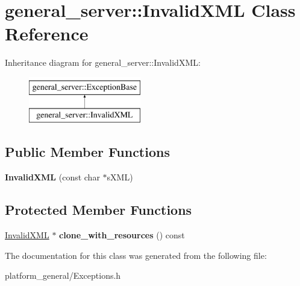 \hypertarget{classgeneral__server_1_1InvalidXML}{\section{general\-\_\-server\-:\-:\-Invalid\-X\-M\-L \-Class \-Reference}
\label{classgeneral__server_1_1InvalidXML}
}
\-Inheritance diagram for general\-\_\-server\-:\-:\-Invalid\-X\-M\-L\-:\begin{figure}[H]
\begin{center}
\leavevmode
\includegraphics[height=2.000000cm]{classgeneral__server_1_1InvalidXML}
\end{center}
\end{figure}
\subsection*{\-Public \-Member \-Functions}
\begin{DoxyCompactItemize}
\item 
\hypertarget{classgeneral__server_1_1InvalidXML_a9f258d33092e09e539108c6c1625bd77}{{\bfseries \-Invalid\-X\-M\-L} (const char $\ast$s\-X\-M\-L)}\label{classgeneral__server_1_1InvalidXML_a9f258d33092e09e539108c6c1625bd77}

\end{DoxyCompactItemize}
\subsection*{\-Protected \-Member \-Functions}
\begin{DoxyCompactItemize}
\item 
\hypertarget{classgeneral__server_1_1InvalidXML_a541bda876d02e02bf325dffab06bc63f}{\hyperlink{classgeneral__server_1_1InvalidXML}{\-Invalid\-X\-M\-L} $\ast$ {\bfseries clone\-\_\-with\-\_\-resources} () const }\label{classgeneral__server_1_1InvalidXML_a541bda876d02e02bf325dffab06bc63f}

\end{DoxyCompactItemize}


\-The documentation for this class was generated from the following file\-:\begin{DoxyCompactItemize}
\item 
platform\-\_\-general/\-Exceptions.\-h\end{DoxyCompactItemize}
